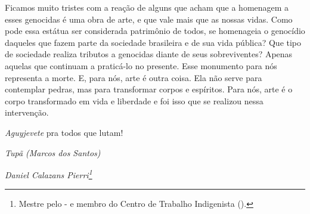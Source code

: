Ficamos muito tristes com a reação de alguns que acham que a homenagem a
esses genocidas é uma obra de arte, e que vale mais que as nossas
vidas. Como pode essa estátua ser considerada patrimônio de todos, se
homenageia o genocídio daqueles que fazem parte da sociedade brasileira
e de sua vida pública? Que tipo de sociedade realiza tributos a
genocidas diante de seus sobreviventes? Apenas aquelas que continuam a
praticá-lo no presente. Esse monumento para nós representa a morte. E,
para nós, arte é outra coisa. Ela não serve para contemplar pedras,
mas para transformar corpos e espíritos. Para nós, arte é o corpo
transformado em vida e liberdade e foi isso que se realizou nessa
intervenção.

\emph{Aguyjevete} pra todos que lutam!
\bigskip
\begin{flushright}
\emph{Tupã (Marcos dos Santos)}
\end{flushright}


\begin{flushright}
\emph{Daniel Calazans Pierri\footnote{Mestre pelo - e membro do
Centro de Trabalho Indigenista ().}}
\end{flushright}
\bigskip

